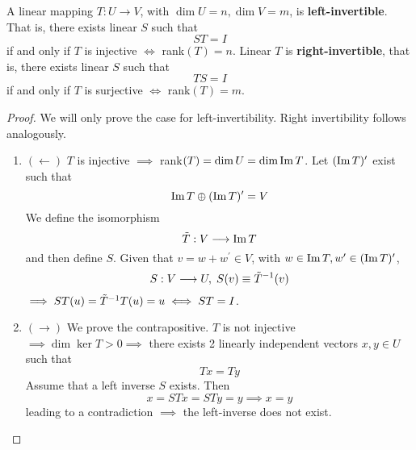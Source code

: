   \begin{theorem}
    A linear mapping $T: U \longrightarrow V$, with $\dim{U} = n, \dim{V} = m$, is \textbf{left-invertible}. That is, there exists linear $S$ such that 
    \begin{equation}
      S T = I
    \end{equation}
    if and only if $T$ is injective $\iff$ rank$(T) = n$. Linear $T$ is \textbf{right-invertible}, that is, there exists linear $S$ such that 
    \begin{equation}
      T S = I
    \end{equation}
    if and only if $T$ is surjective $\iff$ rank$(T) = m$. 
  \end{theorem}
  \begin{proof}
    We will only prove the case for left-invertibility. Right invertibility follows analogously. 
    \begin{enumerate}
      \item $(\leftarrow)$ $T$ is injective $\implies$ rank$(T) = \dim{U} = \dim{\im{T}}$. Let $(\im{T})^\prime$ exist such that 
      \begin{equation}
        \im{T} \oplus (\im{T})^\prime = V
      \end{equation}
      We define the isomorphism 
      \begin{equation}
        \Tilde{T}: V \longrightarrow \im{T}
      \end{equation}
      and then define $S$. Given that $v = w + w^\prime \in V$, with $w \in \im{T}, w^\prime \in (\im{T})^\prime$, 
      \begin{equation}
        S : V \longrightarrow U, \; S(v) \equiv \Tilde{T}^{-1} (v)
      \end{equation}
      $\implies S T (u) = \Tilde{T}^{-1} T (u) = u \iff S T = I$. 

      \item $(\rightarrow)$ We prove the contrapositive. $T$ is not injective $\implies \dim{\ker{T}} > 0 \implies $ there exists 2 linearly independent vectors $x, y \in U$ such that
      \begin{equation}
        T x = T y
      \end{equation}
      Assume that a left inverse $S$ exists. Then 
      \begin{equation}
        x = S T x = S T y = y \implies x = y
      \end{equation}
      leading to a contradiction $\implies$ the left-inverse does not exist. 
    \end{enumerate}
  \end{proof}

